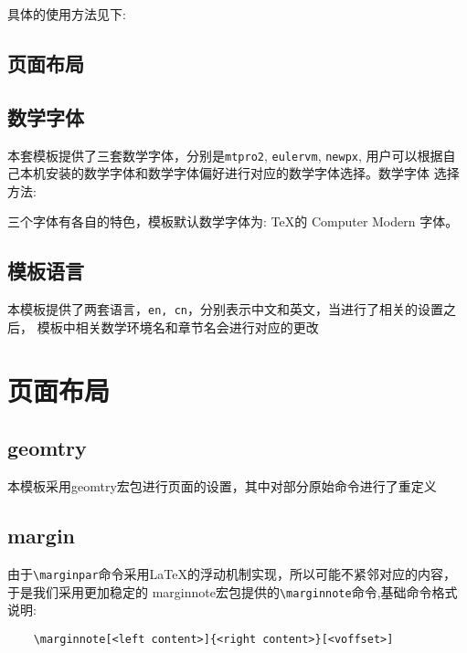 \documentclass[lang=cn, math=mathptmx]{ZLaTeX}
\begin{document}
具体的使用方法见下:

\subsection{页面布局}


\clearpage
\subsection{数学字体}
本套模板提供了三套数学字体，分别是\verb|mtpro2|, \verb|eulervm|, \verb|newpx|,
用户可以根据自己本机安装的数学字体和数学字体偏好进行对应的数学字体选择。数学字体
选择方法:

三个字体有各自的特色，模板默认数学字体为: \TeX{}的 Computer Modern 字体。



\subsection{模板语言}
本模板提供了两套语言，\verb|en, cn|，分别表示中文和英文，当进行了相关的设置之后，
模板中相关数学环境名和章节名会进行对应的更改




\clearpage
\section{页面布局}
\subsection{geomtry}
本模板采用geomtry宏包进行页面的设置，其中对部分原始命令进行了重定义

\subsection{margin}
由于\verb|\marginpar|命令采用\LaTeX{}的浮动机制实现，所以可能不紧邻对应的内容，于是我们采用更加稳定的
marginnote宏包提供的\verb|\marginnote|命令,基础命令格式说明:
\begin{verbatim}
    [<voffset>]
\end{verbatim}
\end{document}
